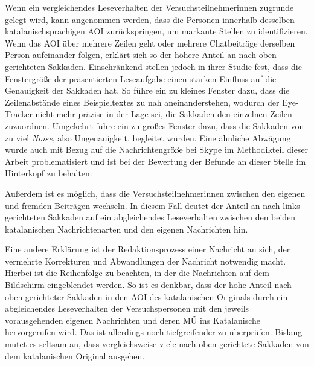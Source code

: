 \begin{sloppypar}
Wenn ein vergleichendes Leseverhalten der Versuchsteilnehmer{\textperiodcentered}innen zugrunde gelegt wird, kann angenommen werden, dass die Personen innerhalb desselben katalanischsprachigen AOI zurückspringen, um markante Stellen zu identifizieren. Wenn das AOI über mehrere Zeilen geht oder mehrere Chatbeiträge derselben Person aufeinander folgen, erklärt sich so der höhere Anteil an nach oben gerichteten Sakkaden. Einschränkend stellen jedoch \citet[129]{biedert_robust_2012} in ihrer Studie fest, dass die Fenstergröße der präsentierten Leseaufgabe einen starken Einfluss auf die Genauigkeit der Sakkaden hat. So führe ein zu kleines Fenster dazu, dass die Zeilenabstände eines Beispieltextes zu nah aneinanderstehen, wodurch der Eye-Tracker nicht mehr präzise in der Lage sei, die Sakkaden den einzelnen Zeilen zuzuordnen. Umgekehrt führe ein zu großes Fenster dazu, dass die Sakkaden von zu viel \emph{Noise}, also Ungenauigkeit, begleitet würden. Eine ähnliche Abwägung wurde auch mit Bezug auf die Nachrichtengröße bei Skype im Methodikteil dieser Arbeit problematisiert und ist bei der Bewertung der Befunde an dieser Stelle im Hinterkopf zu behalten. 

Außerdem ist es möglich, dass die Versuchsteilnehmer{\textperiodcentered}innen zwischen den eigenen und fremden Beiträgen wechseln. In diesem Fall deutet der Anteil an nach links gerichteten Sakkaden auf ein abgleichendes Leseverhalten zwischen den beiden katalanischen Nachrichtenarten und den eigenen Nachrichten hin. 

Eine andere Erklärung ist der Redaktionsprozess einer Nachricht an sich, der vermehrte Korrekturen und Abwandlungen der Nachricht notwendig macht. Hierbei ist die Reihenfolge zu beachten, in der die Nachrichten auf dem Bildschirm eingeblendet werden. So ist es denkbar, dass der hohe Anteil nach oben gerichteter Sakkaden in den AOI des katalanischen Originals durch ein abgleichendes Leseverhalten der Versuchspersonen mit den jeweils vorausgehenden eigenen Nachrichten und deren MÜ ins Katalanische hervorgerufen wird. Das ist allerdings noch tiefgreifender zu überprüfen. Bislang mutet es seltsam an, dass vergleichsweise viele nach oben gerichtete Sakkaden von dem katalanischen Original ausgehen.



\end{sloppypar}
